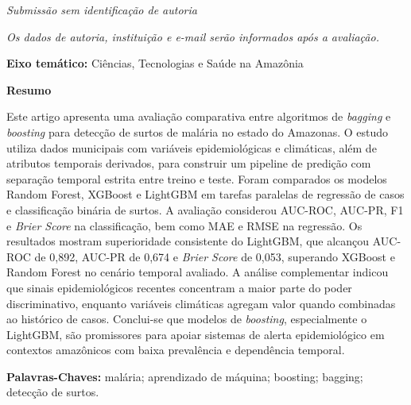 \documentclass[
  12pt,
  openright,
  oneside,
  a4paper,
  brazilian
]{abntex2}
\begin{document}
\begin{center}
{\bfseries\MakeUppercase{\thetitle}}
\end{center}

\begin{center}
\textit{Submiss\~ao sem identifica\c{c}\~ao de autoria}
\end{center}

\begin{center}
\textit{Os dados de autoria, institui\c{c}\~ao e e-mail ser\~ao informados ap\'os a avalia\c{c}\~ao.}
\end{center}

\begin{center}
\textbf{Eixo tem\'atico:} Ci\^encias, Tecnologias e Sa\'ude na Amaz\^onia
\end{center}

\noindent\textbf{Resumo}

\vspace{0.3cm}
\noindent
Este artigo apresenta uma avalia\c{c}\~ao comparativa entre algoritmos de \textit{bagging} e \textit{boosting} para detec\c{c}\~ao de surtos de mal\'aria no estado do Amazonas. O estudo utiliza dados municipais com vari\'aveis epidemiol\'ogicas e clim\'aticas, al\'em de atributos temporais derivados, para construir um pipeline de predi\c{c}\~ao com separa\c{c}\~ao temporal estrita entre treino e teste. Foram comparados os modelos Random Forest, XGBoost e LightGBM em tarefas paralelas de regress\~ao de casos e classifica\c{c}\~ao bin\'aria de surtos. A avalia\c{c}\~ao considerou AUC-ROC, AUC-PR, F1 e \textit{Brier Score} na classifica\c{c}\~ao, bem como MAE e RMSE na regress\~ao. Os resultados mostram superioridade consistente do LightGBM, que alcan\c{c}ou AUC-ROC de 0,892, AUC-PR de 0,674 e \textit{Brier Score} de 0,053, superando XGBoost e Random Forest no cen\'ario temporal avaliado. A an\'alise complementar indicou que sinais epidemiol\'ogicos recentes concentram a maior parte do poder discriminativo, enquanto vari\'aveis clim\'aticas agregam valor quando combinadas ao hist\'orico de casos. Conclui-se que modelos de \textit{boosting}, especialmente o LightGBM, s\~ao promissores para apoiar sistemas de alerta epidemiol\'ogico em contextos amaz\^onicos com baixa preval\^encia e depend\^encia temporal.

\vspace{0.5cm}
\noindent\textbf{Palavras-Chaves:} mal\'aria; aprendizado de m\'aquina; boosting; bagging; detec\c{c}\~ao de surtos.

\vspace{0.8cm}







\postextual

\end{document}
